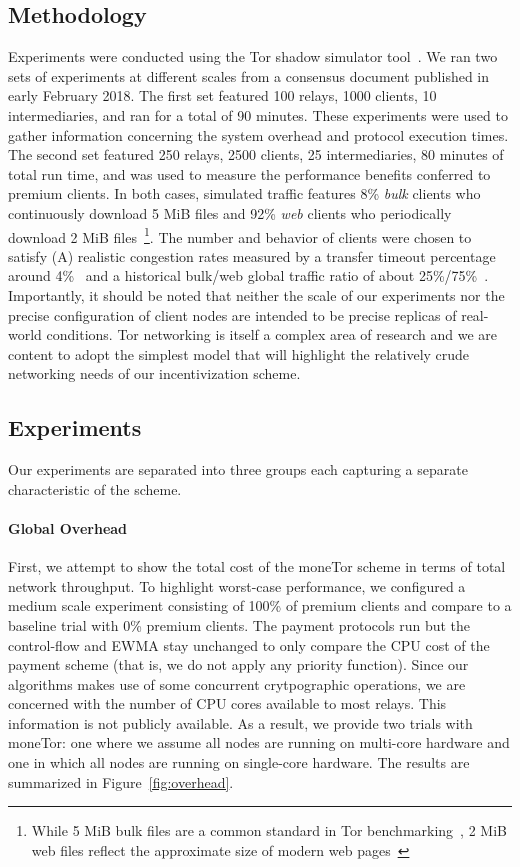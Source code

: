 \subsection{Methodology}
\label{subsec:methodology}


Experiments were conducted using the Tor shadow simulator
tool~\cite{jansen2011shadow, tracey2018high}. We ran two sets of experiments at
different scales from a consensus document published in early February 2018. The
first set featured 100 relays, 1000 clients, 10 intermediaries, and ran for a
total of 90 minutes. These experiments were used to gather information
concerning the system overhead and protocol execution times. The second set
featured 250 relays, 2500 clients, 25 intermediaries, 80 minutes of total run
time, and was used to measure the performance benefits conferred to premium
clients. In both cases, simulated traffic features 8\% \emph{bulk} clients who
continuously download 5 MiB files and 92\% \emph{web} clients who periodically
download 2 MiB files~\footnote{While 5 MiB bulk files are a common standard in
  Tor benchmarking~\cite{portal2018tormetrics}, 2 MiB web files reflect the
  approximate size of modern web pages~\cite{team2018httparchive}}. The number
and behavior of clients were chosen to satisfy (A) realistic congestion rates
measured by a transfer timeout percentage around 4\%~\cite{portal2018tormetrics}
and a historical bulk/web global traffic ratio of about
25\%/75\%~\cite{privcount-ccs2016, learning-ccs2018}. Importantly, it should be
noted that neither the scale of our experiments nor the precise configuration of
client nodes are intended to be precise replicas of real-world conditions. Tor
networking is itself a complex area of research and we are content to adopt the
simplest model that will highlight the relatively crude networking needs of our
incentivization scheme.

\subsection{Experiments}
\label{subsec:experiments}
Our experiments are separated into three groups each capturing a separate
characteristic of the scheme.

\paragraph*{Global Overhead}
First, we attempt to show the total cost of the moneTor scheme in terms of total
network throughput. To highlight worst-case performance, we configured a medium
scale experiment consisting of 100\% of premium clients and compare to a
baseline trial with 0\% premium clients. The payment protocols run but the
control-flow and EWMA stay unchanged to only compare the CPU cost of the payment
scheme (that is, we do not apply any priority function). Since our algorithms
makes use of some concurrent crytpographic operations, we are concerned with the
number of CPU cores available to most relays. This information is not publicly
available. As a result, we provide two trials with moneTor: one where we assume
all nodes are running on multi-core hardware and one in which all nodes are
running on single-core hardware. The results are summarized in
Figure~\ref{fig:overhead}.


